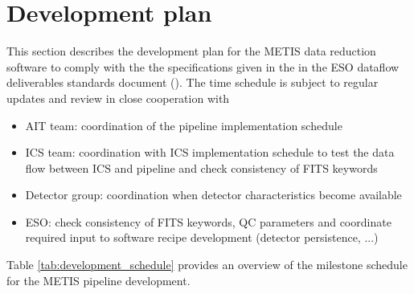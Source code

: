 \clearpage
\section{Development plan}\label{sec:development_plan}

This section describes the development plan for the METIS data reduction software to comply with the the specifications given in the in the ESO dataflow deliverables standards document (\cite{1618}). The time schedule is subject to regular updates and review in close cooperation with

\begin{itemize}
    \item AIT team: coordination of the pipeline implementation schedule
    \item ICS team: coordination with ICS implementation schedule to test the data flow between ICS and pipeline and check consistency of FITS keywords
    \item Detector group: coordination when detector characteristics become available
    \item ESO: check consistency of FITS keywords, QC parameters and coordinate required input to software recipe development (detector persistence, ...)
\end{itemize}

Table \ref{tab:development_schedule} provides an overview of the milestone schedule for the METIS pipeline development.

